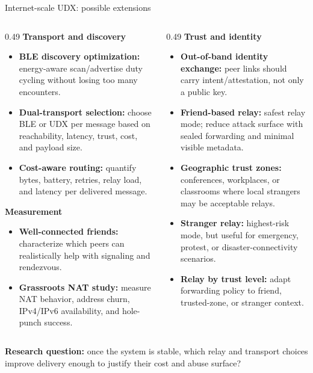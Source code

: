 \begin{frame}{Internet-scale UDX: possible extensions}
\begin{columns}[T,totalwidth=\textwidth]
\begin{column}{0.49\textwidth}
\small
\textbf{\textcolor{TUMBlue}{Transport and discovery}}
\begin{itemize}
  \setlength\itemsep{0.25em}
  \item \textbf{BLE discovery optimization:} energy-aware scan/advertise duty cycling without losing too many encounters.
  \item \textbf{Dual-transport selection:} choose BLE or UDX per message based on reachability, latency, trust, cost, and payload size.
  \item \textbf{Cost-aware routing:} quantify bytes, battery, retries, relay load, and latency per delivered message.
\end{itemize}

\vspace{0.4em}
\textbf{\textcolor{TUMBlue}{Measurement}}
\begin{itemize}
  \setlength\itemsep{0.25em}
  \item \textbf{Well-connected friends:} characterize which peers can realistically help with signaling and rendezvous.
  \item \textbf{Grassroots NAT study:} measure NAT behavior, address churn, IPv4/IPv6 availability, and hole-punch success.
\end{itemize}
\end{column}

\begin{column}{0.49\textwidth}
\small
\textbf{\textcolor{TUMOrange}{Trust and identity}}
\begin{itemize}
  \setlength\itemsep{0.25em}
  \item \textbf{Out-of-band identity exchange:} peer links should carry intent/attestation, not only a public key.
  \item \textbf{Friend-based relay:} safest relay mode; reduce attack surface with sealed forwarding and minimal visible metadata.
  \item \textbf{Geographic trust zones:} conferences, workplaces, or classrooms where local strangers may be acceptable relays.
  \item \textbf{Stranger relay:} highest-risk mode, but useful for emergency, protest, or disaster-connectivity scenarios.
  \item \textbf{Relay by trust level:} adapt forwarding policy to friend, trusted-zone, or stranger context.
\end{itemize}
\end{column}
\end{columns}

\vspace{0.4em}
\begin{center}
\small
\textbf{Research question:} once the system is stable, which relay and transport choices improve delivery enough to justify their cost and abuse surface?
\end{center}
\end{frame}

